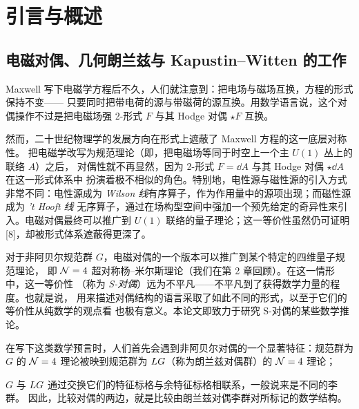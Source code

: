
\chapter{引言与概述}

\section{电磁对偶、几何朗兰兹与 Kapustin--Witten 的工作}


Maxwell 写下电磁学方程后不久，人们就注意到：把电场与磁场互换，方程的形式保持不变——
只要同时把带电荷的源与带磁荷的源互换。用数学语言说，这个对偶操作不过是把电磁场强
2-形式 $F$ 与其 Hodge 对偶 $\star F$ 互换。

然而，二十世纪物理学的发展方向在形式上遮蔽了 Maxwell 方程的这一底层对称性。
把电磁学改写为规范理论（即，把电磁场等同于时空上一个主 $U(1)$ 丛上的联络 $A$）之后，
对偶性就不再显然，因为 2-形式 $F=\dd A$ 与其 Hodge 对偶 $\star\dd A$ 在这一形式体系中
扮演着极不相似的角色。特别地，电性源与磁性源的引入方式非常不同：电性源成为
\emph{Wilson 线}有序算子，作为作用量中的源项出现；而磁性源成为 \emph{'t Hooft 线}
无序算子，通过在场构型空间中强加一个预先给定的奇异性来引入。电磁对偶最终可以推广到
$U(1)$ 联络的量子理论；这一等价性虽然仍可证明 [8]，却被形式体系遮蔽得更深了。


对于非阿贝尔规范群 $G$，电磁对偶的一个版本可以推广到某个特定的四维量子规范理论，
即 $\mathcal{N}=4$ 超对称杨--米尔斯理论（我们在第 2 章回顾）。在这一情形中，这一等价性
（称为 \emph{S-对偶}）远为不平凡——不平凡到了获得数学力量的程度。也就是说，
用来描述对偶结构的语言采取了如此不同的形式，以至于它们的等价性从纯数学的观点看
也极有意义。本论文即致力于研究 S-对偶的某些数学推论。

在写下这类数学预言时，人们首先会遇到非阿贝尔对偶的一个显著特征：规范群为 $G$ 的
$\mathcal{N}=4$ 理论被映到规范群为 $LG$（称为朗兰兹对偶群）的 $\mathcal{N}=4$ 理论；


$G$ 与 $LG$ 通过交换它们的特征标格与余特征标格相联系，一般说来是不同的李群。
因此，比较对偶的两边，就是比较由朗兰兹对偶李群对所标记的数学结构。


